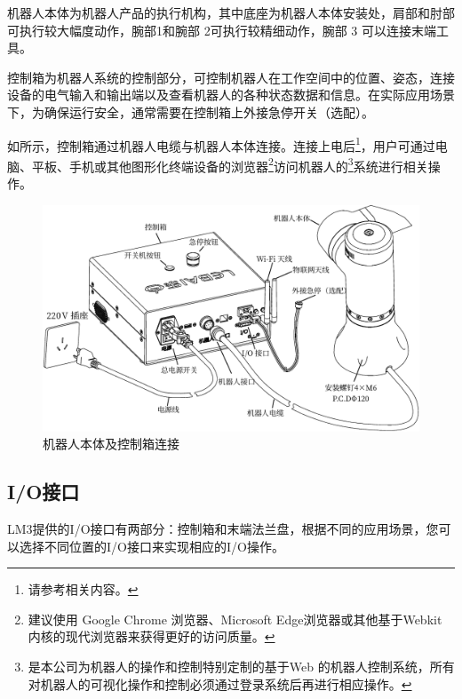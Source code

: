机器人本体为机器人产品的执行机构，其中底座为机器人本体安装处，肩部和肘部可执行较大幅度动作，腕部1和腕部 2可执行较精细动作，腕部 3 可以连接末端工具。

控制箱为机器人系统的控制部分，可控制机器人在工作空间中的位置、姿态，连接设备的电气输入和输出端以及查看机器人的各种状态数据和信息。在实际应用场景下，为确保运行安全，通常需要在控制箱上外接急停开关（选配）。

\clearpage

如所示，控制箱通过机器人电缆与机器人本体连接。连接上电后\footnote{请参考相关内容。}，用户可通过电脑、平板、手机或其他图形化终端设备的浏览器\footnote{建议使用 Google Chrome 浏览器、Microsoft Edge浏览器或其他基于Webkit 内核的现代浏览器来获得更好的访问质量。 }访问机器人的\LM\footnote{\LM 是本公司为机器人的操作和控制特别定制的基于Web 的机器人控制系统，所有对机器人的可视化操作和控制必须通过登录\LM 系统后再进行相应操作。}系统进行相关操作。

\begin{figure}[ht]
    \centering
    \includegraphics[width=\textwidth]{line_graphs/robot_links.pdf}
    \caption{机器人本体及控制箱连接}
    \label{fig:机器人本体及控制箱连接}
\end{figure}

\subsection{I/O接口}

LM3提供的I/O接口有两部分：控制箱和末端法兰盘，根据不同的应用场景，您可以选择不同位置的I/O接口来实现相应的I/O操作。

